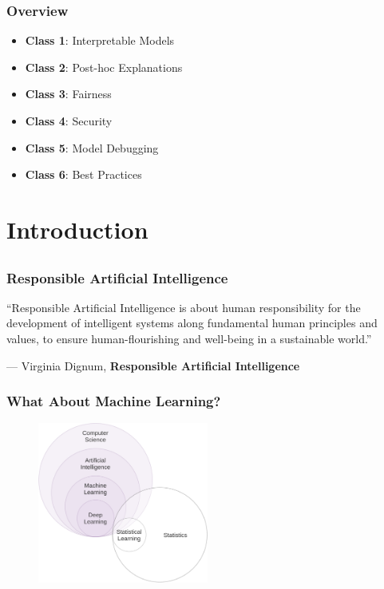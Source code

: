 \documentclass[11pt,aspectratio=169,hyperref={colorlinks}]{beamer}
\begin{document}
	
	\begin{frame}
	
		\frametitle{Overview}
		
		\begin{itemize}
			\item{\textbf{Class 1}: Interpretable Models}
			\item{\textbf{Class 2}: Post-hoc Explanations}
			\item{\textbf{Class 3}: Fairness}
			\item{\textbf{Class 4}: Security}
			\item{\textbf{Class 5}: Model Debugging}
			\item{\textbf{Class 6}: Best Practices}
		\end{itemize}
			
					
	\end{frame}

	\section{Introduction}
	
		\subsection*{}

		\begin{frame}
	
			\frametitle{Responsible Artificial Intelligence}
	
			\epigraph{“Responsible Artificial Intelligence is about human responsibility for the development of intelligent systems along fundamental human principles and values, to ensure human-flourishing and well-being in a sustainable world.”}{--- \textup{Virginia Dignum}, \textbf{Responsible Artificial Intelligence}}
	
		\end{frame}		

		\begin{frame}
	
			\frametitle{What About Machine Learning?}
			
			\begin{figure}[htb]
				\begin{center}
					\includegraphics[height=150pt]{../img/cs_stat.png}
					\label{fig:cs_stat}
				\end{center}
			\end{figure}		
			
		\end{frame}	
\end{document}
